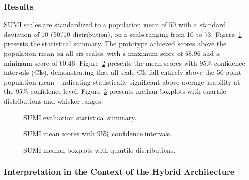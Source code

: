 \documentclass[AMA,LATO1COL]{WileyNJD-v2}
\begin{document}
\subsubsection{Results}

SUMI scales are standardized to a population mean of 50 with a standard deviation of 10 (50/10 distribution), on a scale ranging from 10 to 73. Figure~\ref{fig:sumi_summary} presents the statistical summary. The prototype achieved scores above the population mean on all six scales, with a maximum score of 68.96 and a minimum score of 60.46. Figure~\ref{fig:sumi_ci} presents the mean scores with 95\% confidence intervals (CIs), demonstrating that all scale CIs fall entirely above the 50-point population mean---indicating statistically significant above-average usability at the 95\% confidence level. Figure~\ref{fig:sumi_box} presents median boxplots with quartile distributions and whisker ranges.

\begin{figure}[!ht]
\centering
{}
\caption{SUMI evaluation statistical summary.}\label{fig:sumi_summary}
\end{figure}

\begin{figure}[!ht]
\centering
{}
\caption{SUMI mean scores with 95\% confidence intervals.}\label{fig:sumi_ci}
\end{figure}

\begin{figure}[!ht]
\centering
{}
\caption{SUMI median boxplots with quartile distributions.}\label{fig:sumi_box}
\end{figure}

\subsubsection{Interpretation in the Context of the Hybrid Architecture}
\end{document}
